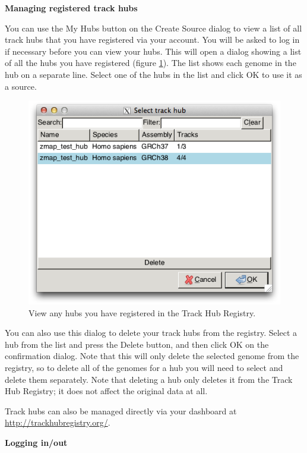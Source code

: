 \documentclass[letterpaper]{article}
\begin{document}
\textbf{Managing registered track hubs}

You can use the My Hubs button on the Create Source dialog to view a list of all track hubs that you have registered via your account. You will be asked to log in if necessary before you can view your hubs. This will open a dialog showing a list of all the hubs you have registered (figure \ref{img_create_source_trackhub_view}). The list shows each genome in the hub on a separate line. Select one of the hubs in the list and click OK to use it as a source.

\begin{figure}
\centering
\color[rgb]{0.30980393,0.5058824,0.7411765}
\includegraphics[resolution=150]{images/create_source_trackhub_view.png}
\caption{View any hubs you have registered in the Track Hub Registry.}
\label{img_create_source_trackhub_view}
\end{figure}

You can also use this dialog to delete your track hubs from the registry. Select a hub from the list and press the Delete button, and then click OK on the confirmation dialog. Note that this will only delete the selected genome from the registry, so to delete all of the genomes for a hub you will need to select and delete them separately. Note that deleting a hub only deletes it from the Track Hub Registry; it does not affect the original data at all.

Track hubs can also be managed directly via your dashboard at \url{http://trackhubregistry.org/}.

\textbf{Logging in/out}
\end{document}

